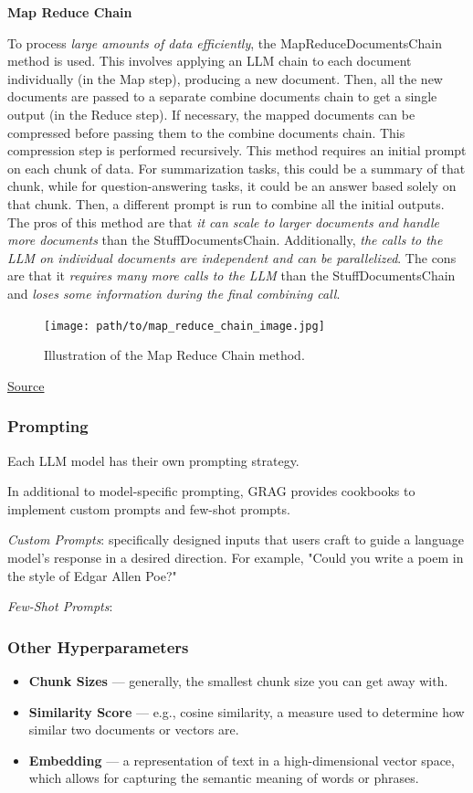 \documentclass{scrartcl}
\begin{document}
\textbf{Map Reduce Chain}

To process \textit{large amounts of data efficiently}, the MapReduceDocumentsChain method is used.
This involves applying an LLM chain to each document individually (in the Map step), producing a new document. Then, all the new documents are passed to a separate combine documents chain to get a single output (in the Reduce step). If necessary, the mapped documents can be compressed before passing them to the combine documents chain.
This compression step is performed recursively.
This method requires an initial prompt on each chunk of data.
For summarization tasks, this could be a summary of that chunk, while for question-answering tasks, it could be an answer based solely on that chunk. Then, a different prompt is run to combine all the initial outputs.
The pros of this method are that \textit{it can scale to larger documents and handle more documents} than the StuffDocumentsChain. Additionally, \textit{the calls to the LLM on individual documents are independent and can be parallelized}.
The cons are that it \textit{requires many more calls to the LLM} than the StuffDocumentsChain and \textit{loses some information during the final combining call}.

\begin{figure}[H]
    \centering
    \texttt{[image: path/to/map\_reduce\_chain\_image.jpg]}
    \caption{Illustration of the Map Reduce Chain method.}
\end{figure}
\href{https://readmedium.com/en/https:/ogre51.medium.com/types-of-chains-in-langchain-823c8878c2e9}{Source}

\subsubsection{Prompting}

Each LLM model has their own prompting strategy.

In additional to model-specific prompting, GRAG provides cookbooks to implement custom prompts and few-shot prompts.

\textit{Custom Prompts}: specifically designed inputs that users craft to guide a language model's response in a desired direction. For example, "Could you write a poem in the style of Edgar Allen Poe?"

\textit{Few-Shot Prompts}:

\subsubsection{Other Hyperparameters}
\begin{itemize}
    \item \textbf{Chunk Sizes} --- generally, the smallest chunk size you can get away with.
    \item \textbf{Similarity Score} --- e.g., cosine similarity, a measure used to determine how similar two documents or vectors are.
    \item \textbf{Embedding} --- a representation of text in a high-dimensional vector space, which allows for capturing the semantic meaning of words or phrases.
\end{itemize}
\end{document}
